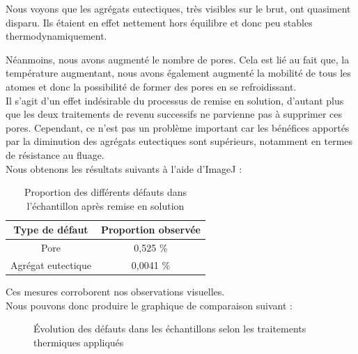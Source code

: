Nous voyons que les agrégats eutectiques, très visibles sur le brut, ont quasiment disparu.
Ils étaient en effet nettement hors équilibre et donc peu stables thermodynamiquement. 

Néanmoins, nous avons augmenté le nombre de pores. Cela est lié au fait que, la température 
augmentant, nous avons également augmenté la mobilité de tous les atomes et donc la possibilité
de former des pores en se refroidissant.\\

Il s'agit d'un effet indésirable du processus de remise en solution, d'autant plus que 
les deux traitements de revenu successifs ne parvienne pas à supprimer ces pores. 
Cependant, ce n'est pas un problème important car les bénéfices apportés par la diminution des 
agrégats eutectiques sont supérieurs, notamment en termes de résistance au fluage. \\

Nous obtenons les résultats suivants à l'aide d'ImageJ :

\begin{table}[H]
    \centering
    \caption{Proportion des différents défauts dans l'échantillon après remise en solution}
    \begin{tabular}{c|c}
        \textbf{Type de défaut}  & \textbf{Proportion observée}  \\
        \hline
        Pore               & 0,525  \% \\
        Agrégat eutectique & 0,0041 \% \\
    \end{tabular}

\end{table}

Ces mesures corroborent nos observations visuelles.\\

Nous pouvons donc produire le graphique de comparaison suivant :


\begin{figure}[htbp]
    \centering
    
    \caption{Évolution des défauts dans les échantillons selon les traitements thermiques appliqués}
    \label{<label>}
\end{figure}


